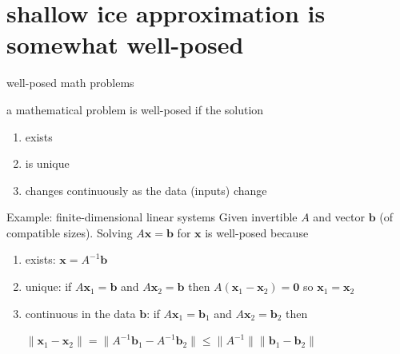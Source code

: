 \documentclass[aspectratio=169,10pt]{beamer}
\newcommand{\bb}{\mathbf{b}}
\newcommand{\bx}{\mathbf{x}}
\newcommand{\bzero}{\symbf{0}}
\begin{document}
\section{shallow ice approximation is somewhat well-posed}

\begin{frame}{well-posed math problems}

\begin{definition}[Hadamard]
a mathematical problem is \alert{well-posed} if the solution
\begin{enumerate}
\item exists
\item is unique
\item changes continuously as the data (inputs) change
\end{enumerate}
\end{definition}

\pause
\small
\begin{block}{Example: finite-dimensional linear systems}
Given invertible $A$ and vector $\bb$ (of compatible sizes).  Solving $A\bx = \bb$ for $\bx$ is well-posed because
\begin{enumerate}
\item exists: $\bx = A^{-1}\bb$
\item unique: if $A\bx_1=\bb$ and $A\bx_2=\bb$ then $A(\bx_1-\bx_2)=\bzero$ so $\bx_1=\bx_2$
\item continuous in the data $\bb$: if $A\bx_1=\bb_1$ and $A\bx_2=\bb_2$ then

\quad $\|\bx_1-\bx_2\| = \|A^{-1}\bb_1 - A^{-1}\bb_2\| \le \|A^{-1}\| \|\bb_1 - \bb_2\|$
\end{enumerate}
\end{block}
\end{frame}
\end{document}
